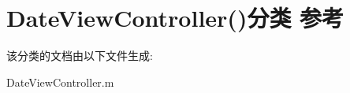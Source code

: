 \hypertarget{category_date_view_controller_07_08}{\section{Date\-View\-Controller()分类 参考}
\label{category_date_view_controller_07_08}
}


该分类的文档由以下文件生成\-:\begin{DoxyCompactItemize}
\item 
Date\-View\-Controller.\-m\end{DoxyCompactItemize}
